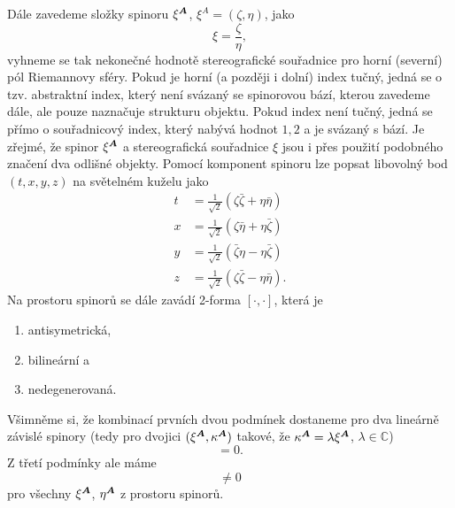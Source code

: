 Dále zavedeme složky spinoru $\xi^{\boldsymbol{A}}$, $\xi^A = (\zeta, \eta)$, jako
\begin{equation}
    \label{eq:zavedeni_slozek_spinoru_z_stereograf_souradnice}
    \xi = \frac{\zeta}{\eta},
\end{equation}
vyhneme se tak nekonečné hodnotě stereografické souřadnice pro horní (severní) pól Riemannovy sféry.
Pokud je horní (a později i dolní) index tučný, jedná se o tzv. abstraktní index, který není svázaný se
spinorovou bází, kterou zavedeme dále, ale pouze naznačuje strukturu objektu. Pokud index není tučný, jedná
se přímo o souřadnicový index, který nabývá hodnot $1, 2$ a je svázaný s bází. Je zřejmé, že spinor $\xi^{\boldsymbol{A}}$
a stereografická souřadnice $\xi$ jsou i přes použití podobného značení
dva odlišné objekty.
Pomocí komponent spinoru lze popsat libovolný bod $(t, x, y, z)$ na světelném kuželu jako
\begin{equation}
    \label{eq:inverse_spinor_souradnicove}
    \begin{split}
        t &= \frac{1}{\sqrt{2}} \left( \zeta\bar{\zeta} + \eta\bar{\eta} \right) \\
        x &= \frac{1}{\sqrt{2}} \left( \zeta\bar{\eta} + \eta\bar{\zeta} \right) \\
        y &= \frac{1}{\sqrt{2}} \left( \bar{\zeta}\eta - \eta\bar{\zeta} \right) \\
        z &= \frac{1}{\sqrt{2}} \left( \zeta\bar{\zeta} - \eta\bar{\eta} \right).
    \end{split}
\end{equation}
Na prostoru spinorů se dále zavádí 2-forma $[ \cdot , \cdot ]$, která je
\begin{enumerate}[(1)]
    \item antisymetrická,
    \item bilineární a
    \item nedegenerovaná.
\end{enumerate}
Všimněme si, že kombinací prvních dvou podmínek dostaneme pro dva lineárně závislé spinory
(tedy pro dvojici $(\xi^{\boldsymbol{A}}, \kappa^{\boldsymbol{A}})$ takové, že $\kappa^{\boldsymbol{A}} = \lambda \xi^{\boldsymbol{A}}$,
$\lambda \in \mathbb{C}$)
\begin{equation}
    [\xi^\Ab, \kappa^\Ab] = 0.
\end{equation}
Z třetí podmínky ale máme
\begin{equation}
    [\xi^\Ab, \eta^\Ab] \neq 0
\end{equation}
pro všechny $\xi^{\boldsymbol{A}}$, $\eta^{\boldsymbol{A}}$ z prostoru spinorů.

